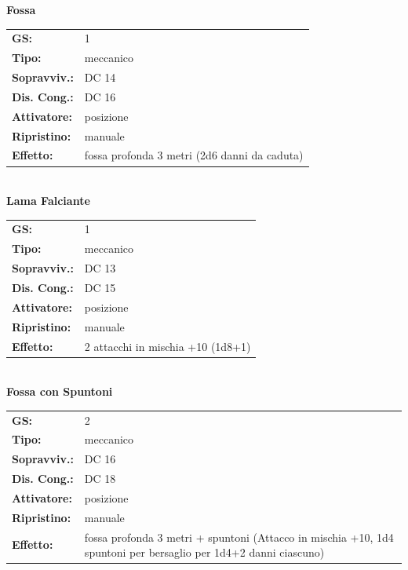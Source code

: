 \begin{multicols}{2}
\textbf{Fossa}

\begin{tabularx}{0.48\textwidth}{lX}
	\textbf{GS:} & 1 \\
	\textbf{Tipo:} & meccanico \\
	\textbf{Sopravviv.:} & DC 14 \\
	\textbf{Dis. Cong.:} & DC 16 \\
	\textbf{Attivatore:} & posizione \\
	\textbf{Ripristino:} & manuale \\
	\textbf{Effetto:} & fossa profonda 3 metri (2d6 danni da caduta) 
\end{tabularx}\\



\textbf{Lama Falciante}

\begin{tabularx}{0.48\textwidth}{lX}
	\textbf{GS:} & 1 \\
	\textbf{Tipo:} & meccanico \\
	\textbf{Sopravviv.:} & DC 13 \\
	\textbf{Dis. Cong.:} & DC 15 \\
	\textbf{Attivatore:} & posizione \\
	\textbf{Ripristino:} & manuale \\
	\textbf{Effetto:} & 2 attacchi in mischia +10 (1d8+1) 
\end{tabularx}\\

\textbf{Fossa con Spuntoni}

\begin{tabularx}{0.48\textwidth}{lX}
	\textbf{GS:} & 2 \\
	\textbf{Tipo:} & meccanico \\
	\textbf{Sopravviv.:} & DC 16 \\
	\textbf{Dis. Cong.:} & DC 18 \\
	\textbf{Attivatore:} & posizione \\
	\textbf{Ripristino:} & manuale \\
	\textbf{Effetto:} & fossa profonda 3 metri + spuntoni (Attacco in mischia +10, 1d4 spuntoni per bersaglio per 1d4+2 danni ciascuno) 
\end{tabularx}\\


\end{multicols}
